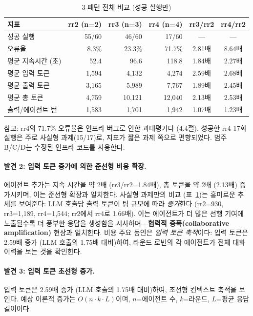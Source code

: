 \begin{table}[H]
\centering
\caption{3-패턴 전체 비교 (성공 실행만)}
\label{tab:cat-a-three}
{\small
\begin{tabular}{lrrrcc}
\toprule
지표 & rr2 (n=2) & rr3 (n=3) & rr4 (n=4) & rr3/rr2 & rr4/rr2 \\
\midrule
성공 실행       & 55/60 & 46/60 & 17/60 & --- & --- \\
오류율           & 8.3\% & 23.3\% & 71.7\% & 2.81배 & 8.64배 \\
평균 지속시간 (초) & 52.4 & 96.6 & 118.8 & 1.84배 & 2.27배 \\
평균 입력 토큰   & 1,594 & 4,132 & 4,274 & 2.59배 & 2.68배 \\
평균 출력 토큰   & 3,165 & 5,989 & 7,767 & 1.89배 & 2.45배 \\
평균 총 토큰     & 4,759 & 10,121 & 12,040 & 2.13배 & 2.53배 \\
출력/에이전트 턴 & 1,583 & 1,701 & 1,942 & 1.07배 & 1.23배 \\
\bottomrule
\end{tabular}
}
\end{table}

참고: rr4의 71.7\% 오류율은 인프라 버그로 인한 과대평가다 (4.4절). 성공한 rr4 17회 실행은 주로 사실형 과제(15/17)로, 지표가 짧은 과제 쪽으로 편향되었다. 범주 B/C/D는 수정된 인프라 코드를 사용한다.

\paragraph{발견 2: 입력 토큰 증가에 의한 준선형 비용 확장.}
에이전트 추가는 지속 시간을 약 2배 (rr3/rr2=1.84배), 총 토큰을 약 2배 (2.13배) 증가시키며, 이는 준선형 확장과 일치한다. 사실형 과제만의 비교 (표~\ref{tab:cat-a-three})는 흥미로운 추세를 보여준다: LLM 호출당 출력 토큰이 팀 규모에 따라 \emph{증가}한다 (rr2=930, rr3=1,189, rr4=1,544; rr2에서 rr4로 1.66배). 이는 에이전트가 더 많은 선행 기여에 노출될수록 더 풍부한 응답을 생성함을 시사하며---\textbf{협력적 증폭(collaborative amplification)} 현상과 일치한다. 비용 주요 동인은 \emph{입력 토큰 축적}이다: 입력 토큰은 2.59배 증가 (LLM 호출의 1.75배 대비)하여, 라운드 로빈의 각 에이전트가 전체 대화 이력을 보는 것을 확인한다.

\paragraph{발견 3: 입력 토큰 초선형 증가.}
입력 토큰은 2.59배 증가 (LLM 호출의 1.75배 대비)하여, 초선형 컨텍스트 축적을 보인다. 예상 이론적 증가는 $O(n \cdot k \cdot L)$이며, $n$=에이전트 수, $k$=라운드, $L$=평균 응답 길이이다.

